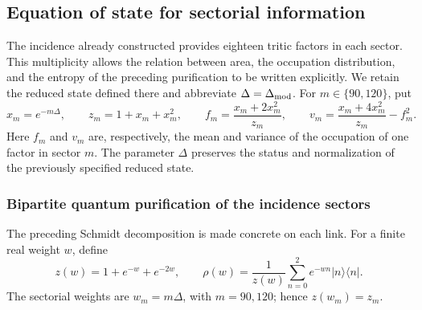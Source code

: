 \subsection{Equation of state for sectorial information}
\label{v:v:ant:sec:ii-ecuacion-informacion}

The incidence already constructed provides eighteen tritic factors in
each sector. This multiplicity allows the relation between area,
the occupation distribution, and the entropy of the preceding
purification to be written explicitly. We retain the reduced state defined there
and abbreviate $\Delta=\Delta_{\rm mod}$. For $m\in\{90,120\}$, put
\begin{equation}
 x_m=e^{-m\Delta},\qquad z_m=1+x_m+x_m^2,\qquad
 f_m=\frac{x_m+2x_m^2}{z_m},\qquad
 v_m=\frac{x_m+4x_m^2}{z_m}-f_m^2.
 \label{v:v:ant:eq:ii-sector-momentos}
\end{equation}
Here $f_m$ and $v_m$ are, respectively, the mean and variance of
the occupation of one factor in sector $m$. The parameter $\Delta$ preserves
the status and normalization of the previously specified reduced
state.

\subsubsection{Bipartite quantum purification of the incidence sectors}
\label{v:v:ant:sec:ii-area-purificacion-producto}

The preceding Schmidt decomposition is made concrete on each link.
For a finite real weight \(w\), define
\[
 z(w)=1+e^{-w}+e^{-2w},\qquad
 \rho(w)=\frac1{z(w)}\sum_{n=0}^2e^{-wn}|n\rangle\langle n|.
\]
The sectorial weights are \(w_m=m\Delta\), with \(m=90,120\);
hence \(z(w_m)=z_m\).

